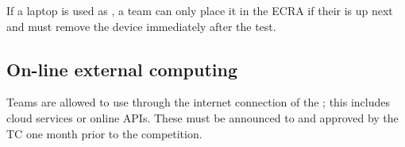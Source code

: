 If a laptop is used as \ExternalComputing, a team can only place it in the ECRA if their \Testslot{} is up next and must remove the device immediately after the test.

\subsection{On-line external computing}
\label{rule:robot_external_computing_online}

Teams are allowed to use \ExternalComputing{} through the internet connection of the \ArenaNetwork{}; this includes cloud services or online APIs.
These must be announced to and approved by the TC one month prior to the competition.

